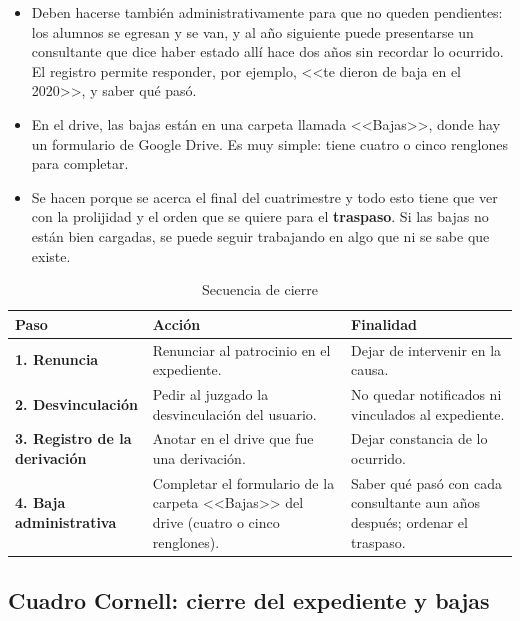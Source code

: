 \documentclass[12pt,oneside]{book}
\begin{document}
\begin{itemize}
    \item Deben hacerse también administrativamente para que no queden pendientes: los alumnos se egresan y se van, y al año siguiente puede presentarse un consultante que dice haber estado allí hace dos años sin recordar lo ocurrido. El registro permite responder, por ejemplo, <<te dieron de baja en el 2020>>, y saber qué pasó.
    \item En el drive, las bajas están en una carpeta llamada <<Bajas>>, donde hay un formulario de Google Drive. Es muy simple: tiene cuatro o cinco renglones para completar.
    \item Se hacen porque se acerca el final del cuatrimestre y todo esto tiene que ver con la prolijidad y el orden que se quiere para el \textbf{traspaso}. Si las bajas no están bien cargadas, se puede seguir trabajando en algo que ni se sabe que existe.
\end{itemize}


\begin{table}[H]
\centering
\caption{Secuencia de cierre}
\begin{tabularx}{\textwidth}{
    >{\raggedright\arraybackslash}p{}
    >{\raggedright\arraybackslash}X
    >{\raggedright\arraybackslash}X
}
\toprule
\textbf{Paso} & \textbf{Acción} & \textbf{Finalidad} \\
\midrule
\textbf{1. Renuncia} &
Renunciar al patrocinio en el expediente. &
Dejar de intervenir en la causa. \\
\addlinespace
\textbf{2. Desvinculación} &
Pedir al juzgado la desvinculación del usuario. &
No quedar notificados ni vinculados al expediente. \\
\addlinespace
\textbf{3. Registro de la derivación} &
Anotar en el drive que fue una derivación. &
Dejar constancia de lo ocurrido. \\
\addlinespace
\textbf{4. Baja administrativa} &
Completar el formulario de la carpeta <<Bajas>> del drive (cuatro o cinco renglones). &
Saber qué pasó con cada consultante aun años después; ordenar el traspaso. \\
\bottomrule
\end{tabularx}
\end{table}

\subsection*{Cuadro Cornell: cierre del expediente y bajas}
\end{document}

